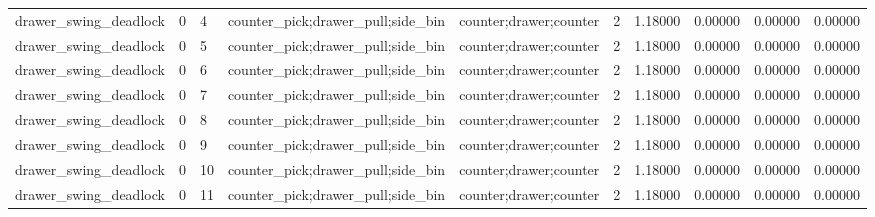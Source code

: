 \documentclass{article}
\begin{document}
\begin{table}[tbp]
{\begin{tabular}{llllllllll}
drawer\_swing\_deadlock & 0 & 4 & counter\_pick;drawer\_pull;side\_bin & counter;drawer;counter & 2 & 1.18000 & 0.00000 & 0.00000 & 0.00000 \\
drawer\_swing\_deadlock & 0 & 5 & counter\_pick;drawer\_pull;side\_bin & counter;drawer;counter & 2 & 1.18000 & 0.00000 & 0.00000 & 0.00000 \\
drawer\_swing\_deadlock & 0 & 6 & counter\_pick;drawer\_pull;side\_bin & counter;drawer;counter & 2 & 1.18000 & 0.00000 & 0.00000 & 0.00000 \\
drawer\_swing\_deadlock & 0 & 7 & counter\_pick;drawer\_pull;side\_bin & counter;drawer;counter & 2 & 1.18000 & 0.00000 & 0.00000 & 0.00000 \\
drawer\_swing\_deadlock & 0 & 8 & counter\_pick;drawer\_pull;side\_bin & counter;drawer;counter & 2 & 1.18000 & 0.00000 & 0.00000 & 0.00000 \\
drawer\_swing\_deadlock & 0 & 9 & counter\_pick;drawer\_pull;side\_bin & counter;drawer;counter & 2 & 1.18000 & 0.00000 & 0.00000 & 0.00000 \\
drawer\_swing\_deadlock & 0 & 10 & counter\_pick;drawer\_pull;side\_bin & counter;drawer;counter & 2 & 1.18000 & 0.00000 & 0.00000 & 0.00000 \\
drawer\_swing\_deadlock & 0 & 11 & counter\_pick;drawer\_pull;side\_bin & counter;drawer;counter & 2 & 1.18000 & 0.00000 & 0.00000 & 0.00000 \\
\bottomrule
\end{tabular}
}
\end{table}

\clearpage
\end{document}
